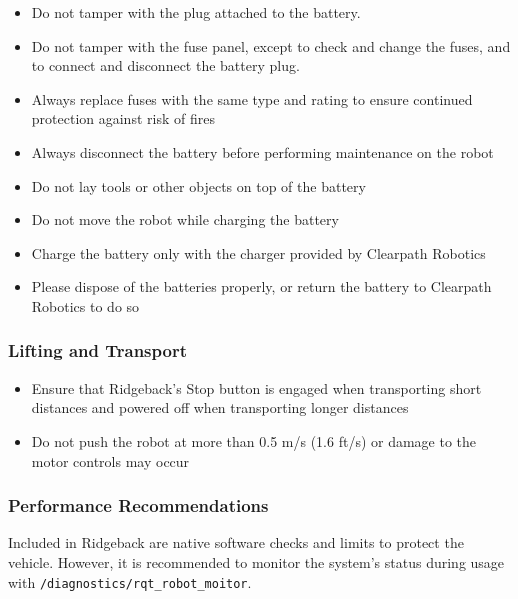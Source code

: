 \documentclass[]{clearpath-latex/clearpath-manual}
\begin{document}
\begin{itemize}[nolistsep]
	\item Do not tamper with the plug attached to the battery.
	\item Do not tamper with the fuse panel, except to check and change the fuses, and to connect and disconnect the 	battery plug.
	\item Always replace fuses with the same type and rating to ensure continued protection against risk of fires
	\item Always disconnect the battery before performing maintenance on the robot
	\item Do not lay tools or other objects on top of the battery   
	\item Do not move the robot while charging the battery
	\item Charge the battery only with the charger provided by Clearpath Robotics
	\item Please dispose of the batteries properly, or return the battery to Clearpath Robotics to do so
\end{itemize}

\subsubsection{Lifting and Transport}

\begin{itemize}[nolistsep]
	\item Ensure that Ridgeback's Stop button is engaged when transporting short distances and powered off when transporting longer distances
	\item Do not push the robot at more than 0.5 m/s (1.6 ft/s) or damage to the motor controls may occur
\end{itemize}

\subsubsection{Performance Recommendations}

Included in Ridgeback are native software checks and limits to protect the vehicle. However, it is recommended to monitor the system’s status during usage with \lstinline{/diagnostics/rqt_robot_moitor}.  
\end{document}
